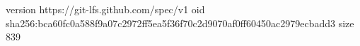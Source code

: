 version https://git-lfs.github.com/spec/v1
oid sha256:bca60fc0a588f9a07c2972ff5ea5f36f70c2d9070af0ff60450ac2979ecbadd3
size 839
